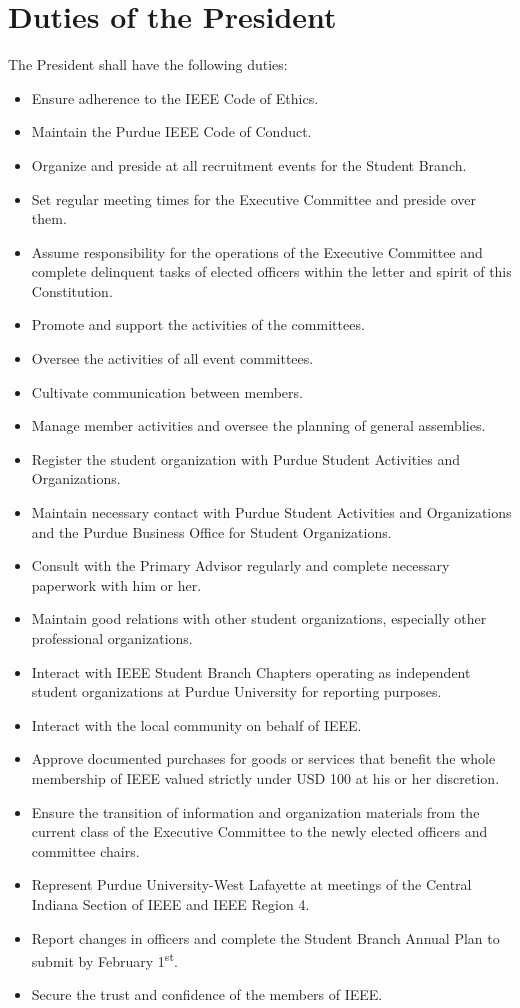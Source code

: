 \documentclass[12pt]{constitution}
\newcommand{\dateannualplansubmit}{February 1\textsuperscript{st}} %
\begin{document}
\section{Duties of the President}
\label{sec:officer_pres}
The President shall have the following duties:
\begin{itemize}
    \item Ensure adherence to the IEEE Code of Ethics.
    \item Maintain the Purdue IEEE Code of Conduct.
    \item Organize and preside at all recruitment events for the Student Branch.
    \item Set regular meeting times for the Executive Committee and preside over them.
    \item Assume responsibility for the operations of the Executive Committee and complete delinquent tasks of elected officers within the letter and spirit of this Constitution.
    \item Promote and support the activities of the committees.
    \item Oversee the activities of all event committees.
    \item Cultivate communication between members.
    \item Manage member activities and oversee the planning of general assemblies.
    \item Register the student organization with Purdue Student Activities and Organizations.
    \item Maintain necessary contact with Purdue Student Activities and Organizations and the Purdue Business Office for Student Organizations.
    \item Consult with the Primary Advisor regularly and complete necessary paperwork with him or her.
    \item Maintain good relations with other student organizations, especially other professional organizations.
    \item Interact with IEEE Student Branch Chapters operating as independent student organizations at Purdue University for reporting purposes.
    \item Interact with the local community on behalf of IEEE.
    \item Approve documented purchases for goods or services that benefit the whole membership of IEEE valued strictly under USD 100 at his or her discretion.
    \item Ensure the transition of information and organization materials from the current class of the Executive Committee to the newly elected officers and committee chairs.
    \item Represent Purdue University-West Lafayette at meetings of the Central Indiana Section of IEEE and IEEE Region 4.
    \item Report changes in officers and complete the Student Branch Annual Plan to submit by \dateannualplansubmit{}.
    \item Secure the trust and confidence of the members of IEEE.
\end{itemize}
\end{document}
